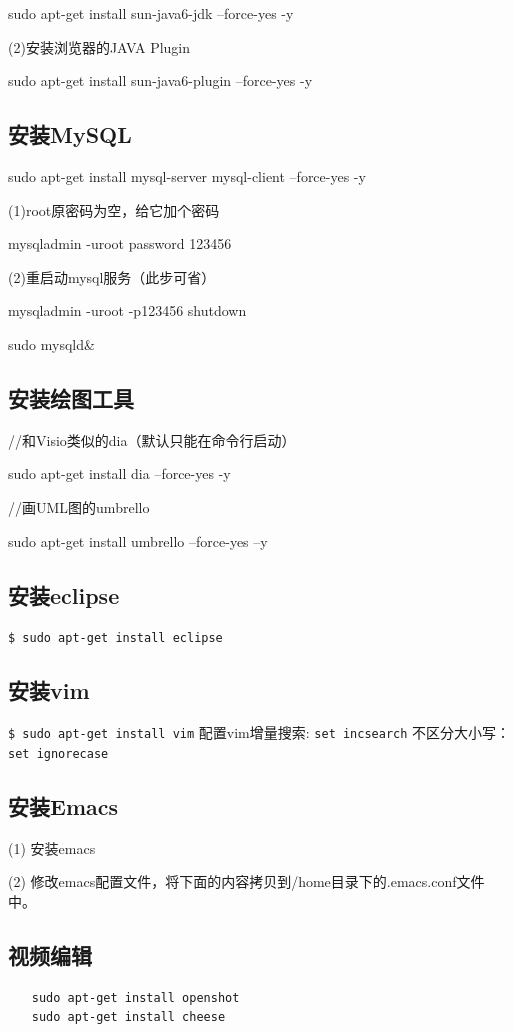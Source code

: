 sudo apt-get install sun-java6-jdk --force-yes -y

(2)安装浏览器的JAVA Plugin

sudo apt-get install sun-java6-plugin --force-yes -y

\subsection{安装MySQL}
sudo apt-get install mysql-server mysql-client --force-yes -y

(1)root原密码为空，给它加个密码

mysqladmin -uroot password 123456

(2)重启动mysql服务（此步可省）

mysqladmin -uroot -p123456 shutdown

sudo mysqld\&

\subsection{安装绘图工具}
//和Visio类似的dia（默认只能在命令行启动）

sudo apt-get install dia --force-yes -y

//画UML图的umbrello


sudo apt-get install umbrello --force-yes –y

\subsection{安装eclipse}
\verb"$ sudo apt-get install eclipse"

\subsection{安装vim}
\verb"$ sudo apt-get install vim"
配置vim增量搜索:
\verb"set incsearch"
不区分大小写：
\verb"set ignorecase"

\subsection{安装Emacs}
(1) 安装emacs

(2) 修改emacs配置文件，将下面的内容拷贝到/home目录下的.emacs.conf文件中。

\subsection{视频编辑}
\begin{verbatim}
　　sudo apt-get install openshot
　　sudo apt-get install cheese
\end{verbatim}

